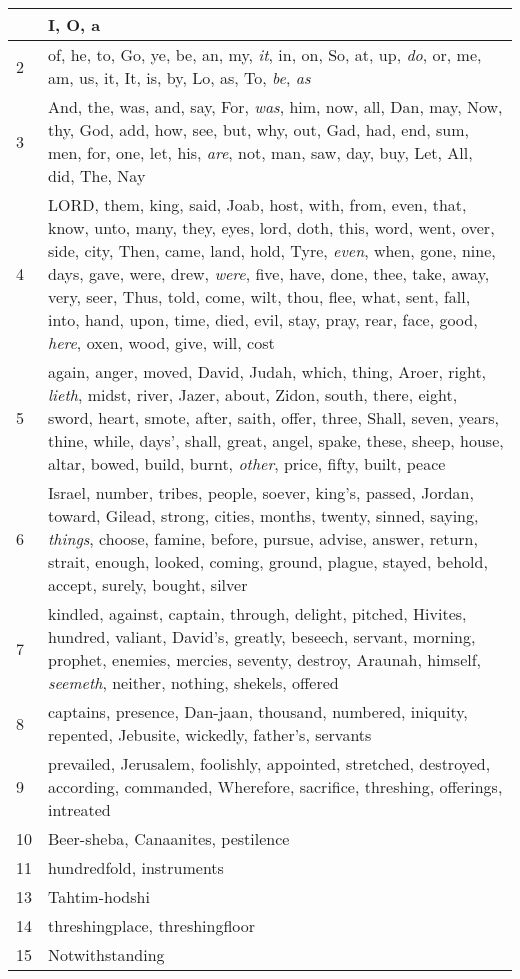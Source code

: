 \begin{longtable}{l|p{3.75in}}
\hline \hline
\endlastfoot
1 & I, O, a \\ \hline
2 & of, he, to, Go, ye, be, an, my, \emph{it}, in, on, So, at, up, \emph{do}, or, me, am, us, it, It, is, by, Lo, as, To, \emph{be}, \emph{as} \\ \hline
3 & And, the, was, and, say, For, \emph{was}, him, now, all, Dan, may, Now, thy, God, add, how, see, but, why, out, Gad, had, end, sum, men, for, one, let, his, \emph{are}, not, man, saw, day, buy, Let, All, did, The, Nay \\ \hline
4 & LORD, them, king, said, Joab, host, with, from, even, that, know, unto, many, they, eyes, lord, doth, this, word, went, over, side, city, Then, came, land, hold, Tyre, \emph{even}, when, gone, nine, days, gave, were, drew, \emph{were}, five, have, done, thee, take, away, very, seer, Thus, told, come, wilt, thou, flee, what, sent, fall, into, hand, upon, time, died, evil, stay, pray, rear, face, good, \emph{here}, oxen, wood, give, will, cost \\ \hline
5 & again, anger, moved, David, Judah, which, thing, Aroer, right, \emph{lieth}, midst, river, Jazer, about, Zidon, south, there, eight, sword, heart, smote, after, saith, offer, three, Shall, seven, years, thine, while, days', shall, great, angel, spake, these, sheep, house, altar, bowed, build, burnt, \emph{other}, price, fifty, built, peace \\ \hline
6 & Israel, number, tribes, people, soever, king's, passed, Jordan, toward, Gilead, strong, cities, months, twenty, sinned, saying, \emph{things}, choose, famine, before, pursue, advise, answer, return, strait, enough, looked, coming, ground, plague, stayed, behold, accept, surely, bought, silver \\ \hline
7 & kindled, against, captain, through, delight, pitched, Hivites, hundred, valiant, David's, greatly, beseech, servant, morning, prophet, enemies, mercies, seventy, destroy, Araunah, himself, \emph{seemeth}, neither, nothing, shekels, offered \\ \hline
8 & captains, presence, Dan-jaan, thousand, numbered, iniquity, repented, Jebusite, wickedly, father's, servants \\ \hline
9 & prevailed, Jerusalem, foolishly, appointed, stretched, destroyed, according, commanded, Wherefore, sacrifice, threshing, offerings, intreated \\ \hline
10 & Beer-sheba, Canaanites, pestilence \\ \hline
11 & hundredfold, instruments \\ \hline
13 & Tahtim-hodshi \\ \hline
14 & threshingplace, threshingfloor \\ \hline
15 & Notwithstanding \\ \hline
\end{longtable}






